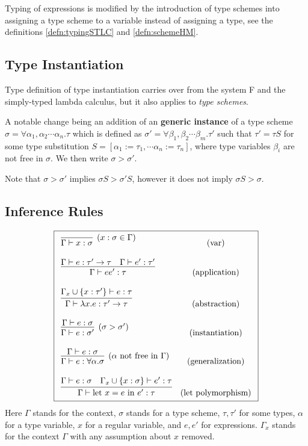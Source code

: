 Typing of expressions is modified by the introduction of type schemes into assigning a type scheme to a variable instead of assigning a type, see the definitions \ref{defn:typingSTLC} and \ref{defn:schemeHM}.

\subsection{Type Instantiation}

Type definition of type instantiation carries over from the system F and the simply-typed lambda calculus, but it also applies to \emph{type schemes}. \cite{damas1982principal}

A notable change being an addition of an \textbf{generic instance} of a type scheme $\sigma = \forall \alpha_1, \alpha_2 \cdots \alpha_n . \tau$ which is defined as $\sigma' = \forall \beta_1, \beta_2 \cdots \beta_m . \tau'$ such that $\tau' = \tau S$ for some type substitution $S = [\alpha_1 := \tau_1, \cdots \alpha_n := \tau_n]$, where type variables $\beta_i$ are not free in $\sigma$. We then write $\sigma > \sigma'$.

Note that $\sigma > \sigma'$ implies $\sigma S > \sigma' S$, however it does not imply $\sigma S > \sigma$.

\subsection{Inference Rules}

\begin{defn}
    $$\boxed{\begin{array}{l c}
        \infer[(x : \sigma \in \Gamma)]{\Gamma \vdash x : \sigma}{} & (\text{var}) \\\\
        \infer{\Gamma \vdash e e' : \tau}{\Gamma \vdash e : \tau' \rightarrow \tau \quad \Gamma \vdash e' : \tau'} & (\text{application}) \\\\
        \infer{\Gamma \vdash \lambda x . e : \tau' \rightarrow \tau}{\Gamma_x \cup \{x : \tau'\} \vdash e : \tau} & (\text{abstraction}) \\\\
        \infer[(\sigma > \sigma')]{\Gamma \vdash e : \sigma'}{\Gamma \vdash e : \sigma} & (\text{instantiation}) \\\\
        \infer[(\alpha \text{ not free in }\Gamma)]{\Gamma \vdash e : \forall \alpha . \sigma}{\Gamma \vdash e : \sigma} & (\text{generalization}) \\\\
        \infer{\Gamma \vdash \text{let } x = e \text{ in } e' : \tau}{\Gamma \vdash e : \sigma \quad \Gamma_x \cup \{x :\sigma\} \vdash e' : \tau} & (\text{let polymorphism})
    \end{array}}$$
    Here $\Gamma$ stands for the context, $\sigma$ stands for a type scheme, $\tau, \tau'$ for some types, $\alpha$ for a type variable, $x$ for a regular variable, and $e, e'$ for expressions. $\Gamma_x$ stands for the context $\Gamma$ with any assumption about $x$ removed.
\end{defn}

